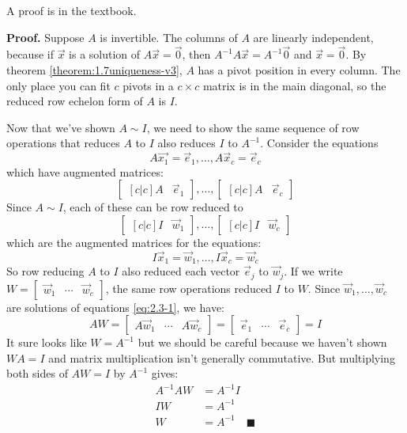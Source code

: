 \documentclass[11pt, letterpaper]{report}
\newenvironment{notes}{}{}
\newenvironment{book}{}{}
\newcounter{theorem}[chapter]
\begin{document}
\begin{notes}
A proof is in the textbook.

\newpage
\end{notes}

\begin{book}
\textbf{Proof.} Suppose $A$ is invertible. The columns of $A$ are linearly independent, because if $\vec{x}$ is a solution of $A\vec{x}= \vec{0}$, then $A^{-1}A\vec{x}=A^{-1}\vec{0}$ and $\vec{x}=\vec{0}$. By theorem \ref{theorem:1.7uniqueness-v3}, $A$ has a pivot position in every column. The only place you can fit $c$ pivots in a $c\times c$ matrix is in the main diagonal, so the reduced row echelon form of $A$ is $I$.

Now that we've shown $A \sim I$, we need to show the same sequence of row operations that reduces $A$ to $I$ also reduces $I$ to $A^{-1}$. Consider the equations
\begin{equation}
\label{eq:2.3-1}
A\vec{x_1}= \vec{e}_1, \ldots, A\vec{x}_c=\vec{e}_c
\end{equation}
which have augmented matrices:
\[ \begin{bmatrix}[c|c]
A & \vec{e}_1
\end{bmatrix}, \ldots, \begin{bmatrix}[c|c]
A & \vec{e}_c
\end{bmatrix}\]
Since $A \sim I$, each of these can be row reduced to
\[ \begin{bmatrix}[c|c]
I & \vec{w}_1
\end{bmatrix},\ldots, \begin{bmatrix}[c|c]
I & \vec{w}_c
\end{bmatrix}\]
which are the augmented matrices for the equations:
\[I\vec{x}_1=\vec{w}_1,\ldots, I\vec{x}_c=\vec{w}_c\]
So row reducing $A$ to $I$ also reduced each vector $\vec{e}_j$ to $\vec{w}_j$. If we write $W = \begin{bmatrix}
\vec{w}_1 & \cdots & \vec{w}_c
\end{bmatrix}$, the same row operations reduced $I$ to $W$. Since $\vec{w}_1,\ldots,\vec{w}_c$ are solutions of equations \ref{eq:2.3-1}, we have:
\[AW = \begin{bmatrix}
A\vec{w}_1 & \cdots & A\vec{w}_c
\end{bmatrix} = \begin{bmatrix}
\vec{e}_1 & \cdots & \vec{e}_c
\end{bmatrix} = I\]
It sure looks like $W = A^{-1}$ but we should be careful because we haven't shown $WA = I$ and matrix multiplication isn't generally commutative. But multiplying both sides of $AW = I$ by $A^{-1}$ gives:
\begin{align*}
A^{-1}AW &= A^{-1}I\\
IW &= A^{-1}\\
W &= A^{-1} \quad \blacksquare
\end{align*}
\end{book}
\end{document}
